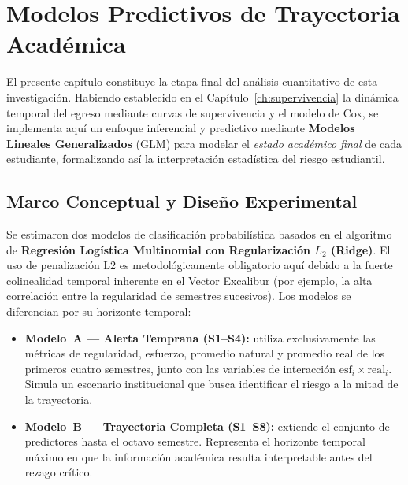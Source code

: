 \chapter{Modelos Predictivos de Trayectoria Académica}
\label{ch:modelos_predictivos}

El presente capítulo constituye la etapa final del análisis cuantitativo de esta investigación.
Habiendo establecido en el Capítulo~\ref{ch:supervivencia} la dinámica temporal del egreso mediante
curvas de supervivencia y el modelo de Cox, se implementa aquí un enfoque inferencial y predictivo
mediante \textbf{Modelos Lineales Generalizados} (GLM) para modelar el \emph{estado académico final}
de cada estudiante, formalizando así la interpretación estadística del riesgo estudiantil.

\section{Marco Conceptual y Diseño Experimental}

Se estimaron dos modelos de clasificación probabilística basados en el algoritmo de
\textbf{Regresión Logística Multinomial con Regularización $L_2$ (Ridge)}. El uso de penalización
L2 es metodológicamente obligatorio aquí debido a la fuerte colinealidad temporal inherente en
el Vector Excalibur (por ejemplo, la alta correlación entre la regularidad de semestres sucesivos).
Los modelos se diferencian por su horizonte temporal:

\begin{itemize}
    \item \textbf{Modelo~A — Alerta Temprana (S1–S4):} utiliza exclusivamente las métricas de
          regularidad, esfuerzo, promedio natural y promedio real de los primeros cuatro semestres,
          junto con las variables de interacción $\text{esf}_i \times \text{real}_i$. Simula un
          escenario institucional que busca identificar el riesgo a la mitad de la trayectoria.
    \item \textbf{Modelo~B — Trayectoria Completa (S1–S8):} extiende el conjunto de predictores
          hasta el octavo semestre. Representa el horizonte temporal máximo en que la información
          académica resulta interpretable antes del rezago crítico.
\end{itemize}

